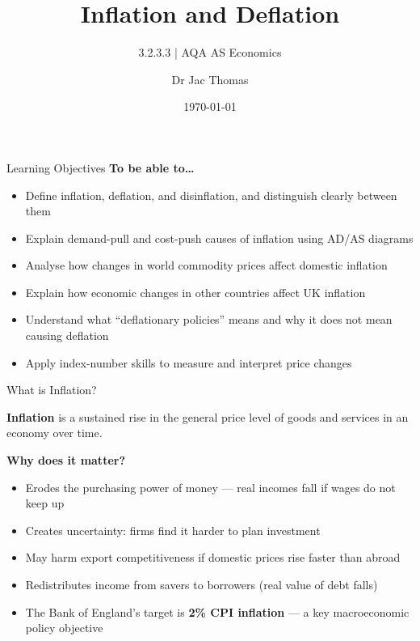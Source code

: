 \documentclass[16pt,aspectratio=169]{beamer}
\title{Inflation and Deflation}
\subtitle{3.2.3.3 | AQA AS Economics}
\author{Dr Jac Thomas}
\date{\today}
\begin{document}
\begin{frame}
    \titlepage
\end{frame}

\begin{frame}{Learning Objectives}
    \textbf{To be able to\ldots}
    \begin{itemize}
        \item Define inflation, deflation, and disinflation, and distinguish clearly between them
        \item Explain demand-pull and cost-push causes of inflation using AD/AS diagrams
        \item Analyse how changes in world commodity prices affect domestic inflation
        \item Explain how economic changes in other countries affect UK inflation
        \item Understand what ``deflationary policies'' means and why it does not mean causing deflation
        \item Apply index-number skills to measure and interpret price changes
    \end{itemize}
\end{frame}

\begin{frame}{What is Inflation?}
    \begin{definition}
        \textbf{Inflation} is a sustained rise in the general price level of goods and services in an economy over time.
    \end{definition}

    \vspace{0.8em}
    \textbf{Why does it matter?}
    \begin{itemize}
        \item Erodes the purchasing power of money --- real incomes fall if wages do not keep up
        \item Creates uncertainty: firms find it harder to plan investment
        \item May harm export competitiveness if domestic prices rise faster than abroad
        \item Redistributes income from savers to borrowers (real value of debt falls)
        \item The Bank of England's target is \textbf{2\% CPI inflation} --- a key macroeconomic policy objective
    \end{itemize}
\end{frame}
\end{document}
